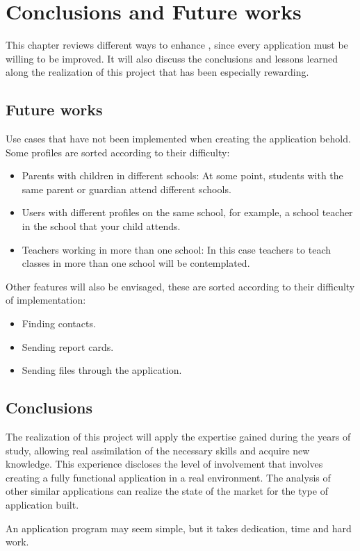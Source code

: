 %
%
%
%

\cleardoublepage
\chapter{Conclusions and Future works}
\label{chap:futureLines}

	This chapter reviews different ways to enhance \CollegeApp, since every application must be willing to be improved. It will also discuss the conclusions and lessons learned along the realization of this project that has been especially rewarding.

	\section{Future works}
	
		Use cases that have not been implemented when creating the application behold. Some profiles are sorted according to their difficulty:
		
		\begin{itemize}
			\item Parents with children in different schools: At some point, students with the same parent or guardian attend different schools.
			\item Users with different profiles on the same school, for example, a school teacher in the school that your child attends.
			\item Teachers working in more than one school: In this case teachers to teach classes in more than one school will be contemplated.
		\end{itemize}
		
		Other features will also be envisaged, these are sorted according to their difficulty of implementation:
		
		\begin{itemize}
			\item Finding contacts.
			\item Sending report cards.
			\item Sending files through the application.
		\end{itemize}
	
	\section{Conclusions}
		The realization of this project will apply the expertise gained during the years of study, allowing real assimilation of the necessary skills and acquire new knowledge.
		This experience discloses the level of involvement that involves creating a fully functional application in a real environment. The analysis of other similar applications can realize the state of the market for the type of application built.
		
		\bigskip
		An application program may seem simple, but it takes dedication, time and hard work.